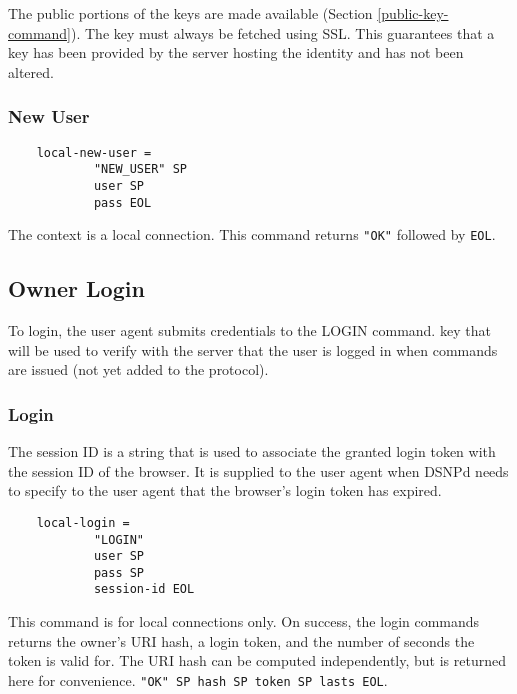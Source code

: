 \documentclass[letterpaper,11pt,oneside]{article}
\begin{document}
The public portions of the keys are made available (Section
\ref{public-key-command}). The key must always be fetched using SSL. This
guarantees that a key has been provided by the server hosting the identity and
has not been altered.

\subsubsection{New User}

\vspace{10pt}
\begin{verbatim}
    local-new-user = 
            "NEW_USER" SP
            user SP 
            pass EOL
\end{verbatim}
\vspace{10pt}

The context is a local connection. This command returns \verb|"OK"| followed by
\verb|EOL|.

\subsection{Owner Login}

To login, the user agent submits credentials to the LOGIN command. key that
will be used to verify with the server that the user is logged in when commands
are issued (not yet added to the protocol).

\subsubsection{Login}

The session ID is a string that is used to associate the granted login token
with the session ID of the browser. It is supplied to the user agent when DSNPd
needs to specify to the user agent that the browser's login token has expired.

\vspace{10pt}
\begin{verbatim}
    local-login = 
            "LOGIN" 
            user SP 
            pass SP 
            session-id EOL
\end{verbatim}
\vspace{10pt}

This command is for local connections only. On success, the login commands
returns the owner's URI hash, a login token, and the number of seconds the
token is valid for. The URI hash can be computed independently, but is returned
here for convenience. \verb|"OK" SP hash SP token SP lasts EOL|.
\end{document}
